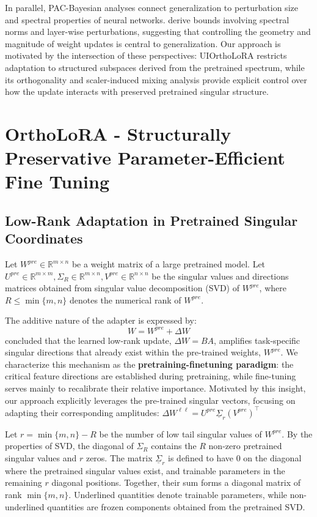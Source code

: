 \documentclass{article}
\begin{document}
In parallel, PAC-Bayesian analyses connect generalization to perturbation size and spectral properties of neural networks. \citet{neyshabur2017pac, neyshabur2018pacbayesian} derive bounds involving spectral norms and layer-wise perturbations, suggesting that controlling the geometry and magnitude of weight updates is central to generalization. Our approach is motivated by the intersection of these perspectives: UIOrthoLoRA restricts adaptation to structured subspaces derived from the pretrained spectrum, while its orthogonality and scaler-induced mixing analysis provide explicit control over how the update interacts with preserved pretrained singular structure.



\section{OrthoLoRA - Structurally Preservative Parameter-Efficient Fine Tuning}

\subsection{Low-Rank Adaptation in Pretrained Singular Coordinates}

Let $W^{pre} \in \mathbb{R}^{m \times n}$ be a weight matrix of a large pretrained model. Let $U^{pre} \in \mathbb{R}^{m \times m}, \Sigma_R \in \mathbb{R}^{m \times n}, V^{pre} \in \mathbb{R}^{n \times n}$ be the singular values and directions matrices obtained from singular value decomposition (SVD) of $W^{pre}$, where $R \leq \min\{m,n\}$ denotes the numerical rank of $W^{pre}$.

The additive nature of the adapter is expressed by:
\[
W = W^{pre} + \Delta W
\]
\citet{hu2022lora} concluded that the learned low-rank update, $\Delta W = BA$, amplifies task-specific singular directions that already exist within the pre-trained weights, $W^{pre}$. We characterize this mechanism as the \textbf{pretraining-finetuning paradigm}\label{def}: the critical feature directions are established during pretraining, while fine-tuning serves mainly to recalibrate their relative importance. Motivated by this insight, our approach explicitly leverages the pre-trained singular vectors, focusing on adapting their corresponding amplitudes:
$\Delta W^{\ell \ell} = U^{pre} \underline{\Sigma}_r (V^{pre})^\top
$

Let $r = \min\{m,n\} - R$ be the number of low tail singular values of $W^{pre}$. By the properties of SVD, the diagonal of $\Sigma_R$ contains the $R$ non-zero pretrained singular values and $r$ zeros. The matrix $\underline{\Sigma}_r$ is defined to have $0$ on the diagonal where the pretrained singular values exist, and trainable parameters in the remaining $r$ diagonal positions. Together, their sum forms a diagonal matrix of rank $\min\{m,n\}$. Underlined quantities denote trainable parameters, while non-underlined quantities are frozen components obtained from the pretrained SVD.
\end{document}
